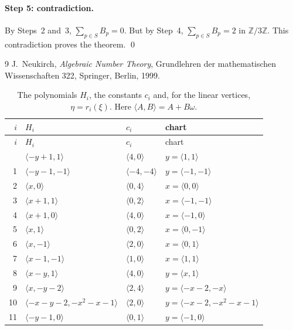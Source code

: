 \documentclass[11pt]{article}
\newcommand{\Z}{\mathbb{Z}}
\begin{document}
\paragraph{Step 5: contradiction.} By Steps~2 and~3, $\sum_{p\in S}B_p=0$. But by Step~4, $\sum_{p\in S}B_p=2$ in $\Z/3\Z$. This contradiction proves the theorem.
\qed


\begin{thebibliography}{9}
 J.~Neukirch, \emph{Algebraic Number Theory}, Grundlehren der mathematischen Wissenschaften 322, Springer, Berlin, 1999.
\end{thebibliography}

\clearpage
\begingroup\small
\setlength{\LTcapwidth}{\textwidth}
\begin{longtable}{@{}rlll@{}}
\caption{The polynomials $H_i$, the constants $c_i$ and, for the linear vertices, $\eta=r_i(\xi)$. Here $\langle A,B\rangle=A+B\omega$.}\label{tab:vert1}\\
\hline $i$ & $H_i$ & $c_i$ & chart\\\hline\endfirsthead\hline $i$ & $H_i$ & $c_i$ & chart\\\hline\endhead\hline\endfoot
0 & $\langle -y+1,1\rangle$ & $\langle 4,0\rangle$ & $y=\langle 1,1\rangle$\\
1 & $\langle -y-1,-1\rangle$ & $\langle -4,-4\rangle$ & $y=\langle -1,-1\rangle$\\
2 & $\langle x,0\rangle$ & $\langle 0,4\rangle$ & $x=\langle 0,0\rangle$\\
3 & $\langle x+1,1\rangle$ & $\langle 0,2\rangle$ & $x=\langle -1,-1\rangle$\\
4 & $\langle x+1,0\rangle$ & $\langle 4,0\rangle$ & $x=\langle -1,0\rangle$\\
5 & $\langle x,1\rangle$ & $\langle 0,2\rangle$ & $x=\langle 0,-1\rangle$\\
6 & $\langle x,-1\rangle$ & $\langle 2,0\rangle$ & $x=\langle 0,1\rangle$\\
7 & $\langle x-1,-1\rangle$ & $\langle 1,0\rangle$ & $x=\langle 1,1\rangle$\\
8 & $\langle x-y,1\rangle$ & $\langle 4,0\rangle$ & $y=\langle x,1\rangle$\\
9 & $\langle x,-y-2\rangle$ & $\langle 2,4\rangle$ & $y=\langle -x-2,-x\rangle$\\
10 & $\langle -x-y-2,-x^{2}-x-1\rangle$ & $\langle 2,0\rangle$ & $y=\langle -x-2,-x^{2}-x-1\rangle$\\
11 & $\langle -y-1,0\rangle$ & $\langle 0,1\rangle$ & $y=\langle -1,0\rangle$\\

\end{longtable}
\end{document}
